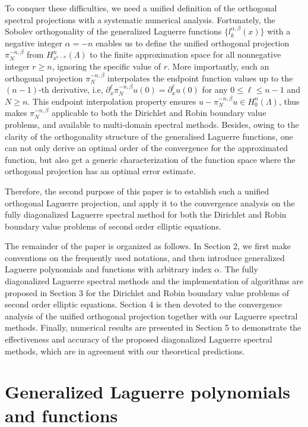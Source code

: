\documentclass[10pt,reqno]{amsart}
\theoremstyle{remark}
\theoremstyle{definition}
\begin{document}
To conquer  these difficulties, we need a unified definition
of the orthogonal spectral projections with a systematic numerical  analysis.
Fortunately, the Sobolev orthogonality of the  generalized Laguerre functions $\big\{ l^{\alpha,\beta}_k(x)  \big\}$ with
a negative integer $\alpha=-n$  enables  us to  define the unified
 orthogonal projection $\pi^{-n,\beta}_N$ from $H^{n}_{x^{r-n}}(\Lambda)$
to the finite approximation space
for all nonnegative integer $r\ge n$, ignoring the specific value of $r$.
More importantly,  such an  orthogonal projection $\pi^{-n,\beta}_N$ interpolates
the endpoint function values up to the $(n-1)$-th derivative, i.e,
$\partial_x^{\ell}\pi^{-n,\beta}_Nu(0)= \partial_x^{\ell}u(0)$ for any $0 \le\ell \le n-1 $  and  $N\ge n$.
This endpoint interpolation property ensures $u-\pi^{-n,\beta}_Nu\in H_0^n(\Lambda)$,  thus makes $\pi^{-n,\beta}_N$  applicable to  both the Dirichlet and Robin boundary value problems, and available to  multi-domain spectral methods.
Besides, owing to the clarity of the orthogonality structure of the generalised Laguerre functions,
one can not only derive an optimal order of the convergence for the approximated  function, but also get a generic  characterization of the function space where  the orthogonal projection has an optimal error estimate.

Therefore, the second purpose of this paper is to establish such a unified orthogonal Laguerre projection, and apply
it to the convergence analysis on the fully diagonalized Laguerre spectral method
for both the Dirichlet and Robin boundary value problems of second order elliptic equations.

The remainder of the paper is organized as follows. In Section 2, we first make conventions on the
frequently used notations, and then introduce  generalized Laguerre polynomials and functions
with arbitrary index $\alpha$. The fully diagonalized Laguerre spectral methods and the implementation of
algorithms
are proposed in Section 3 for the Dirichlet and Robin boundary value problems of  second order elliptic equations. Section 4 is then devoted to the convergence analysis of
the unified orthogonal projection  together with  our   Laguerre spectral methods.
Finally, numerical results are presented in Section 5 to demonstrate the effectiveness
and accuracy of
the proposed diagonalized  Laguerre spectral methods, which are in agreement with
our theoretical predictions.

\section{Generalized Laguerre polynomials and functions}
\setcounter{equation}{0} \setcounter{lmm}{0} \setcounter{thm}{0}
\end{document}

